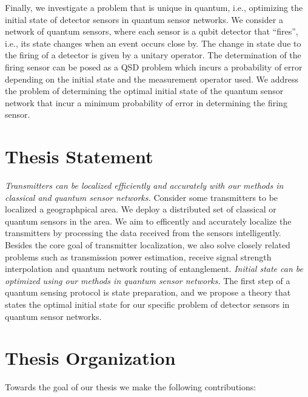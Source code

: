 Finally, we investigate a problem that is unique in quantum, i.e., optimizing the initial state of detector sensors 
in quantum sensor networks. We consider a network of quantum sensors, where each sensor is a qubit detector that “fires”, 
i.e., its state changes when an event occurs close by. The change in state due to the firing of a detector is given 
by a unitary operator. The determination of the firing sensor can be posed as a QSD problem which incurs a probability 
of error depending on the initial state and the measurement operator used. We address the problem of determining 
the optimal initial state of the quantum sensor network that incur a minimum probability of error in determining the firing sensor.


\section{Thesis Statement}

\emph{Transmitters can be localized efficiently and accurately with our methods in classical and quantum sensor networks.}
Consider some transmitters to be localized a geographpical area. We deploy a distributed set of classical or quantum sensors in the area.
We aim to efficently and accurately localize the transmitters by processing the data received from the sensors intelligently.
Besides the core goal of transmitter localization, we also solve closely related problems such as transmission power estimation, 
receive signal strength interpolation and quantum network routing of entanglement.
\emph{Initial state can be optimized using our methods in quantum sensor networks.} 
The first step of a quantum sensing protocol is state preparation, and we propose a theory that states the optimal initial state 
for our specific problem of detector sensors in quantum sensor networks.

\section{Thesis Organization}

Towards the goal of our thesis we make the following contributions:

